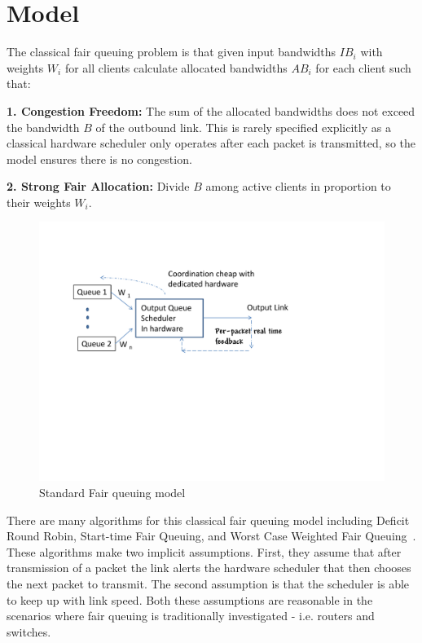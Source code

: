 \section{Model}
\label{sec:model}

The classical fair queuing problem is that given input bandwidths $IB_i$ with
weights $W_i$ for all clients calculate allocated bandwidths $AB_i$ for each
client such that:  

{\bf 1. Congestion Freedom:}  The sum of the allocated bandwidths does not
exceed the bandwidth $B$ of the outbound link. This is rarely specified
explicitly as a classical hardware scheduler only operates after each packet is
transmitted, so the model ensures there is no congestion.

{\bf 2. Strong Fair Allocation: } Divide $B$ among active clients in proportion
to their weights $W_i$.

\begin{figure}[t]
\center
\includegraphics[width=\columnwidth,trim=6mm 90mm 20mm 10mm]{figures/standardqosmodel}
\caption{Standard Fair queuing model}
\label{fig:qosmodel}
\vspace{-2mm}
\end{figure}

There are many algorithms for this classical fair queuing model including
Deficit Round Robin, Start-time Fair Queuing, and Worst Case Weighted Fair
Queuing~\cite{drr, stfq,w2fq, qfq}. These algorithms make two implicit
assumptions. First, they assume that after transmission of a packet the link
alerts the hardware scheduler that then chooses the next packet to transmit. The
second assumption is that the scheduler is able to keep up with link speed.
Both these assumptions are reasonable in the scenarios where fair queuing is
traditionally investigated - i.e. routers and switches.

